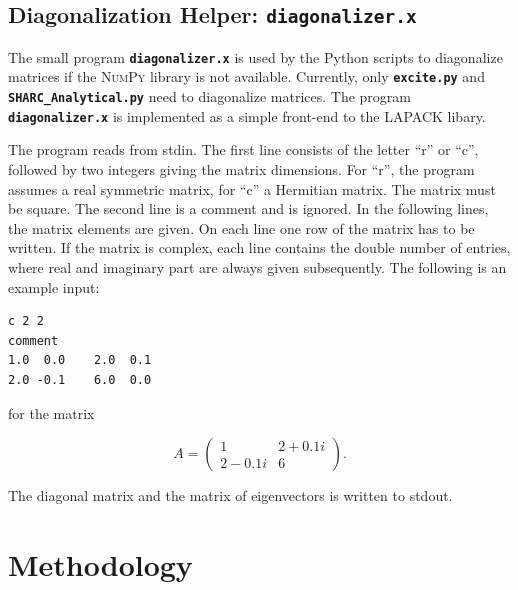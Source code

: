 \documentclass[a4paper,11pt,DIV=15,openany,twoside=false]{scrbook}
\newcommand{\ttmdump}[1]{#1}
\newcommand{\ttt}[1]{\textbf{\texttt{#1}}}
\newenvironment{example}{
  \vspace{0mm}
  \definecolor{shadecolor}{HTML}{BBDDFF}
  \begin{shaded}
  \begin{minipage}{0.9\textwidth}
}{
  \end{minipage}
  \end{shaded}
}
\begin{document}
\section{Diagonalization Helper: \ttt{diagonalizer.x}}\label{sec:diagonalizer.x}

The small program \ttt{diagonalizer.x} is used by the Python scripts to diagonalize matrices if the \textsc{NumPy} library is not available. Currently, only \ttt{excite.py} and \ttt{SHARC\_Analytical.py} need to diagonalize matrices. The program \ttt{diagonalizer.x} is implemented as a simple front-end to the LAPACK libary.

The program reads from stdin. The first line consists of the letter ``r'' or ``c'', followed by two integers giving the matrix dimensions. For ``r'', the program assumes a real symmetric matrix, for ``c'' a Hermitian matrix. The matrix must be square.
The second line is a comment and is ignored.
In the following lines, the matrix elements are given. On each line one row of the matrix has to be written. If the matrix is complex, each line contains the double number of entries, where real and imaginary part are always given subsequently.
The following is an example input:
\begin{example}
\footnotesize\begin{verbatim}
c 2 2
comment
1.0  0.0    2.0  0.1
2.0 -0.1    6.0  0.0
\end{verbatim}
\end{example}

\normalsize
for the matrix 
\ttmdump{
  \begin{equation}
    A=\begin{pmatrix}
        1 &2+0.1i\\
        2-0.1i&6
      \end{pmatrix}.\nonumber
  \end{equation}
}
The diagonal matrix and the matrix of eigenvectors is written to stdout.




\chapter{Methodology}
\end{document}
